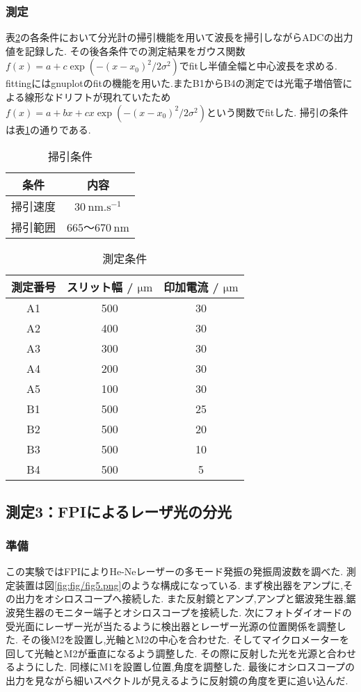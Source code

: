\subsubsection{測定}
表\ref{tab:measure2_condition}の各条件において分光計の掃引機能を用いて波長を掃引しながらADCの出力値を記録した.
その後各条件での測定結果をガウス関数$f(x)=a+c\exp(-(x-x_0)^2/2\sigma^2)$でfitし半値全幅と中心波長を求める.
fittingにはgnuplotのfitの機能を用いた.またB1からB4の測定では光電子増倍管による線形なドリフトが現れていたため
$f(x)=a+bx+cx\exp(-(x-x_0)^2/2\sigma^2)$という関数でfitした.
掃引の条件は表\ref{tab:sweep_condition}の通りである.
\begin{table}[h]
\caption{掃引条件}
\label{tab:sweep_condition}
\centering
\begin{tabular}{cc}
\hline
条件&内容\\
\hline \hline
掃引速度&$30\ \si{\nano\metre.\second^{-1}}$\\
掃引範囲&$665$〜$670\ \si{\nano\metre}$\\
\hline
\end{tabular}
\end{table}
\begin{table}[h]
\caption{測定条件}
\label{tab:measure2_condition}
\centering
\begin{tabular}{c|cc}
\hline
測定番号&スリット幅 / $\si{\micro\metre}$&印加電流 / $\si{\micro\metre}$\\
\hline \hline
A1&500&30\\
A2&400&30\\
A3&300&30\\
A4&200&30\\
A5&100&30\\
B1&500&25\\
B2&500&20\\
B3&500&10\\
B4&500&5\\
\hline
\end{tabular}
\end{table}
\subsection{測定3：FPIによるレーザ光の分光}
\subsubsection{準備}
この実験ではFPIによりHe-Neレーザーの多モード発振の発振周波数を調べた.
測定装置は図\ref{fig:fig/fig5.png}のような構成になっている.
まず検出器をアンプに,その出力をオシロスコープへ接続した.
また反射鏡とアンプ,アンプと鋸波発生器,鋸波発生器のモニター端子とオシロスコープを接続した.
次にフォトダイオードの受光面にレーザー光が当たるように検出器とレーザー光源の位置関係を調整した.
その後M2を設置し,光軸とM2の中心を合わせた.
そしてマイクロメーターを回して光軸とM2が垂直になるよう調整した.
その際に反射した光を光源と合わせるようにした.
同様にM1を設置し位置,角度を調整した.
最後にオシロスコープの出力を見ながら細いスペクトルが見えるように反射鏡の角度を更に追い込んだ.
